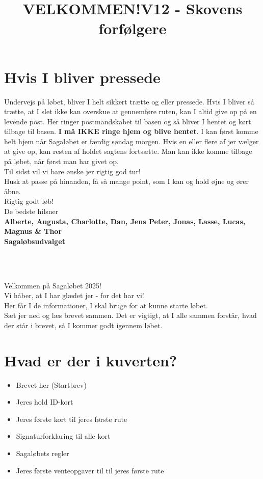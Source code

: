 \section{Hvis I bliver pressede}
Undervejs på løbet, bliver I helt sikkert trætte og eller pressede. Hvis I bliver så trætte, at I slet ikke kan overskue at gennemføre ruten, kan I altid give op på en levende post. Her ringer postmandskabet til basen og så bliver I hentet og kørt tilbage til basen. \textbf{I må IKKE ringe hjem og blive hentet}. I kan først komme helt hjem når Sagaløbet er færdig søndag morgen. Hvis en eller flere af jer vælger at give op, kan resten af holdet sagtens fortsætte. Man kan ikke komme tilbage på løbet, når først man har givet op.\\
\newline
Til sidst vil vi bare ønske jer rigtig god tur!\\
Husk at passe på hinanden, få så mange point, som I kan og hold øjne og ører åbne.\\
\newline
Rigtig godt løb!\\
\newline
\textcolor{søblå}{De bedste hilsner}\\
\textcolor{natblå}{\textbf{Alberte, Augusta, Charlotte, Dan, Jens Peter, Jonas, Lasse, Lucas, Magnus \& Thor}}\\
\textcolor{natblå}{\textbf{Sagaløbsudvalget}}\\
\newpage
\title{VELKOMMEN!}\\
\newline
\title{\textcolor{søblå}{V12 - Skovens forfølgere }}\\
\newline
Velkommen på Sagaløbet 2025!\\
Vi håber, at I har glædet jer - for det har vi!\\
Her får I de informationer, I skal bruge for at kunne starte løbet.\\
Sæt jer ned og læs brevet sammen. Det er vigtigt, at I alle sammen forstår, hvad der står i brevet, så I kommer godt igennem løbet.
\section{Hvad er der i kuverten?}
\begin{itemize}
    \item Brevet her (Startbrev)
    \item Jeres hold ID-kort
    \item Jeres første kort til jeres første rute
    \item Signaturforklaring til alle kort
    \item Sagaløbets regler
    \item Jeres første venteopgaver til til jeres første rute
\end{itemize}
